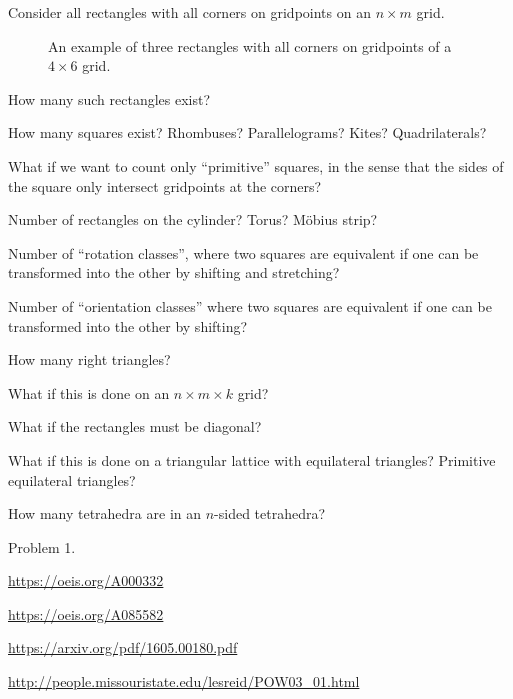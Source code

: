 \documentclass{article}
\begin{document}
Consider all rectangles with all corners on gridpoints on an $n \times m$ grid.
\begin{figure}[!h]
  \centering
  \caption{
    An example of three rectangles with all corners on gridpoints of a
    $4 \times 6$ grid.
  }
\end{figure}

\begin{question}
  How many such rectangles exist?
\end{question}
\begin{related}
  \item How many squares exist? Rhombuses? Parallelograms? Kites? Quadrilaterals?
  \item What if we want to count only ``primitive'' squares, in the sense that
    the sides of the square only intersect gridpoints at the corners?
  \item Number of rectangles on the cylinder? Torus? M\"obius strip?
  \item Number of ``rotation classes'', where two squares are equivalent if
    one can be transformed into the other by shifting and stretching?
  \item Number of ``orientation classes'' where two squares are equivalent if
    one can be transformed into the other by shifting?
  \item How many right triangles?
  \item What if this is done on an $n \times m \times k$ grid?
  \item What if the rectangles must be diagonal?
  \item What if this is done on a triangular lattice with equilateral triangles?
    Primitive equilateral triangles?
  \item How many tetrahedra are in an $n$-sided tetrahedra?
\end{related}
\begin{references}
  \item Problem 1.
  \item \url{https://oeis.org/A000332}
  \item \url{https://oeis.org/A085582}
  \item \url{https://arxiv.org/pdf/1605.00180.pdf}
  \item \url{http://people.missouristate.edu/lesreid/POW03_01.html}
\end{references}
\end{document}
